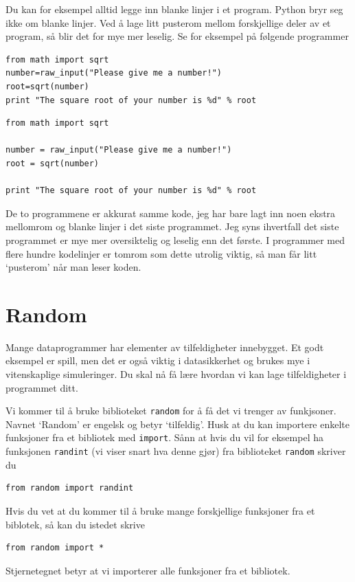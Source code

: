 \documentclass[a4paper, 11pt, notitlepage]{article}
\begin{document}
Du kan for eksempel alltid legge inn blanke linjer i et program. Python bryr seg ikke om blanke linjer. Ved å lage litt pusterom mellom forskjellige deler av et program, så blir det for mye mer leselig. Se for eksempel på følgende programmer

\begin{lstlisting}
from math import sqrt
number=raw_input("Please give me a number!")
root=sqrt(number)
print "The square root of your number is %d" % root
\end{lstlisting}

\begin{lstlisting}
from math import sqrt

number = raw_input("Please give me a number!")
root = sqrt(number)

print "The square root of your number is %d" % root
\end{lstlisting}

De to programmene er akkurat samme kode, jeg har bare lagt inn noen ekstra mellomrom og blanke linjer i det siste programmet. Jeg syns ihvertfall det siste programmet er mye mer oversiktelig og leselig enn det første. I programmer med flere hundre kodelinjer er tomrom som dette utrolig viktig, så man får litt `pusterom' når man leser koden.



\section*{Random}

Mange dataprogrammer har elementer av tilfeldigheter innebygget. Et godt eksempel er spill, men det er også viktig i datasikkerhet og brukes mye i vitenskaplige simuleringer. Du skal nå få lære hvordan vi kan lage tilfeldigheter i programmet ditt.

Vi kommer til å bruke biblioteket \verb+random+ for å få det vi trenger av funkjsoner. Navnet `Random' er engelsk og betyr `tilfeldig'. Husk at du kan importere enkelte funksjoner fra et bibliotek med \verb+import+. Sånn at hvis du vil for eksempel ha funksjonen \verb+randint+ (vi viser snart hva denne gjør) fra biblioteket \verb+random+ skriver du
\begin{lstlisting}
from random import randint
\end{lstlisting}

Hvis du vet at du kommer til å bruke mange forskjellige funksjoner fra et biblotek, så kan du istedet skrive
\begin{lstlisting}
from random import *
\end{lstlisting}
Stjernetegnet betyr at vi importerer alle funksjoner fra et bibliotek.
\end{document}

